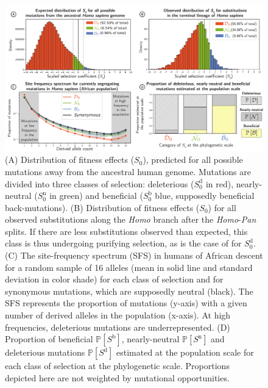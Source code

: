 \documentclass{article}
\newcommand{\proba}{\mathbb{P}}
\newcommand{\Sphy}{S_{0}}
\newcommand{\Spop}{S}
\newcommand{\PpolyDel}{\proba [ \Spop^{\text{d}}]}
\newcommand{\PpolyNeutral}{\proba [ \Spop^{\text{n}} ]}
\newcommand{\PpolyAdv}{\proba [ \Spop^{\text{b}} ]}
\begin{document}
    \begin{figure}[!ht]
        \centering
        \includegraphics[width=\textwidth, page=1] {artworks/figure.homo-afr-results}
        \caption{
            (A) Distribution of fitness effects ($\Sphy$), predicted for all possible mutations away from the ancestral human genome.
            Mutations are divided into three classes of selection: deleterious ($\Sphy^{\text{d}}$ in red), nearly-neutral ($\Sphy^{\text{n}}$ in green) and beneficial ($\Sphy^{\text{b}}$ blue, supposedly beneficial back-mutations).
            (B) Distribution of fitness effects ($\Sphy$) for all observed substitutions along the \textit{Homo} branch after the \textit{Homo}-\textit{Pan} splits.
            If there are less substitutions observed than expected, this class is thus undergoing purifying selection, as is the case of for $\Sphy^{\text{d}}$.
            (C) The site-frequency spectrum (SFS) in humans of African descent for a random sample of 16 alleles (mean in solid line and standard deviation in color shade) for each class of selection and for synonymous mutations, which are supposedly neutral (black). The SFS represents the proportion of mutations (y-axis) with a given number of derived alleles in the population (x-axis).
            At high frequencies, deleterious mutations are underrepresented.
            (D) Proportion of beneficial $\PpolyAdv$, nearly-neutral $\PpolyNeutral$ and deleterious mutations $\PpolyDel$ estimated at the population scale for each class of selection at the phylogenetic scale. Proportions depicted here are not weighted by mutational opportunities.
        }
        \label{fig:homo-afr-results}
    \end{figure}
\end{document}
